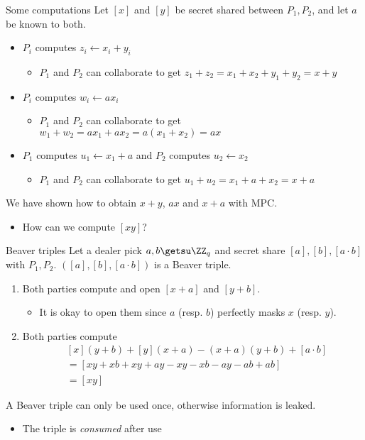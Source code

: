 \begin{frame}{Some computations}
  Let $[x]$ and $[y]$ be secret shared between $P_1, P_2$, and let $a$ be known to both.
  \begin{itemize}[<+(1)->]
    \item $P_i$ computes $z_i \gets x_i + y_i$
    \begin{itemize}
      \item $P_1$ and $P_2$ can collaborate to get $z_1 + z_2 = x_1 + x_2 + y_1 + y_2 = x + y$
    \end{itemize}
    \item $P_i$ computes $w_i \gets ax_i$
    \begin{itemize}
      \item $P_1$ and $P_2$ can collaborate to get $w_1 + w_2 = ax_1 + ax_2 = a(x_1 + x_2) = ax$
    \end{itemize}
    \item $P_1$ computes $u_1 \gets x_1 + a$ and $P_2$ computes $u_2 \gets x_2$
    \begin{itemize}
      \item $P_1$ and $P_2$ can collaborate to get $u_1 + u_2 = x_1 + a + x_2 = x + a$
    \end{itemize}
  \end{itemize}

  \vspace*{1em}

  \pause
  We have shown how to obtain $x + y$, $ax$ and $x + a$ with MPC.
  \begin{itemize}[<+(1)->]
    \item How can we compute $[xy]$?
  \end{itemize}
\end{frame}

\begin{frame}{Beaver triples}
  Let a dealer pick $a, b \getsu \ZZ_q$ and secret share $[a], [b], [a \cdot b]$ with $P_1, P_2$.
  $([a], [b], [a \cdot b])$ is a Beaver triple.
  \begin{enumerate}[<+(1)->]
    \item Both parties compute and open $[x + a]$ and $[y + b]$.
    \begin{itemize}
      \item It is okay to open them since $a$ (resp. $b$) perfectly masks $x$ (resp. $y$).
    \end{itemize}
    \item Both parties compute
    \begin{align*}
      &[x](y + b) + [y](x + a) - (x+a)(y+b) + [a\cdot b]\\
      &= [xy + xb + xy + ay - xy - xb - ay - ab + ab]\\
      &= [xy]
    \end{align*}
  \end{enumerate}
  \vspace*{-1em}
  \pause
  A Beaver triple can only be used once, otherwise information is leaked.
  \begin{itemize}
    \item The triple is \emph{consumed} after use
  \end{itemize}
\end{frame}

